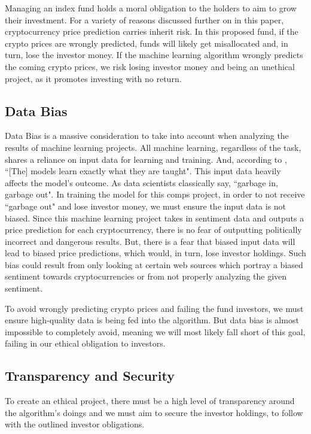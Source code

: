 \documentclass[10pt,twocolumn]{article}
\begin{document}
Managing an index fund holds a moral obligation to the holders to aim to grow their investment. For a variety of reasons discussed further on in this paper, cryptocurrency price prediction carries inherit risk. In this proposed fund, if the crypto prices are wrongly predicted, funds will likely get misallocated and, in turn, lose the investor money. If the machine learning algorithm wrongly predicts the coming crypto prices, we risk losing investor money and being an unethical project, as it promotes investing with no return.

\subsection{Data Bias}

Data Bias is a massive consideration to take into account when analyzing the results of machine learning projects. All machine learning, regardless of the task, shares a reliance on input data for learning and training. And, according to , ``[The] models learn exactly what they are taught". This input data heavily affects the model's outcome. As data scientists classically say, ``garbage in, garbage out". In training the model for this comps project, in order to not receive ``garbage out" and lose investor money, we must ensure the input data is not biased. Since this machine learning project takes in sentiment data and outputs a price prediction for each cryptocurrency, there is no fear of outputting politically incorrect and dangerous results. But, there is a fear that biased input data will lead to biased price predictions, which would, in turn, lose investor holdings. Such bias could result from only looking at certain web sources which portray a biased sentiment towards cryptocurrencies or from not properly analyzing the given sentiment.

To avoid wrongly predicting crypto prices and failing the fund investors, we must ensure high-quality data is being fed into the algorithm. But data bias is almost impossible to completely avoid, meaning we will most likely fall short of this goal, failing in our ethical obligation to investors.

\subsection{Transparency and Security}

To create an ethical project, there must be a high level of transparency around the algorithm's doings and we must aim to secure the investor holdings, to follow with the outlined investor obligations.
\end{document}
